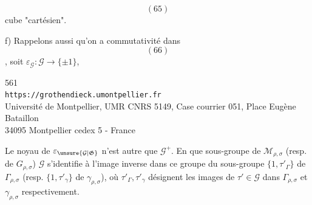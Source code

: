 \[
(65)
\]
cube "cartésien".

f) Rappelons aussi qu'on a commutativité dans
\[
(66)
\]
, soit \(\varepsilon_{\mathcal G}:\mathcal G\longrightarrow\{\pm1\}\),


{\small
\begin{center}
561\\
\texttt{https://grothendieck.umontpellier.fr}\\
Université de Montpellier, UMR CNRS 5149, Case courrier 051, Place Eugène Bataillon\\
34095 Montpellier cedex 5 - France
\end{center}
}


Le noyau de $\varepsilon_{\unsure{\mathcal{G}|\mathfrak{G}}}$ n'est autre que $\mathcal{G}^{+}$. En  que sous-groupe de $\mathcal M_{\rho,\sigma}$ (resp. de $G_{\rho,\sigma}$) $\mathcal{G}$ s'identifie à l'image inverse dans ce groupe du sous-groupe $\{1,\tau'_{\Gamma}\}$ de $\Gamma_{\rho,\sigma}$ (resp.  $\{1,\tau'_{\gamma}\}$ de $\gamma_{\rho,\sigma}$), où $\tau'_{\Gamma},\tau'_{\gamma}$ désignent les images de $\tau'\in\mathcal{G}$ dans $\Gamma_{\rho,\sigma}$ et $\gamma_{\rho,\sigma}$ respectivement.

